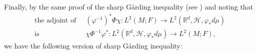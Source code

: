 \documentclass[11pt,oneside,reqno]{amsart}
\newtheorem{proposition}[theorem]{Proposition}
\theoremstyle{definition}
\numberwithin{equation}{section}
\theoremstyle{plain}
\begin{document}





Finally, by the same proof of the sharp Gårding inequality (see \cite[Proposition E.24]{dyatlovzworski2019resonances}) and noting that 
\begin{equation}\label{adjointofcutoff}
\begin{aligned}
\text{the adjoint of } & \  (\varphi^{-1})^*\Phi \chi: L^2(M;F)\to L^{2}(\mathbb{R}^d,\mathcal{H},\varphi_{*}d\mu) \\
\text{is} & \  \chi \Phi^{-1} \varphi^*: L^{2}(\mathbb{R}^d,\mathcal{H}, \varphi_{*}d\mu)\to L^2(M;F),
\end{aligned}
\end{equation}
we have the following version of sharp Gårding inequality:
\end{document}

